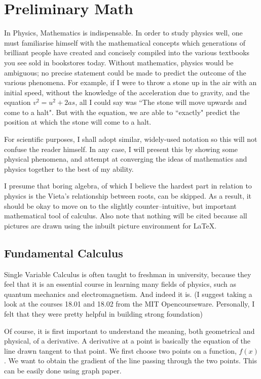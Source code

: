 \section{Preliminary Math}
In Physics, Mathematics is indispensable. In order to study physics well, one must familiarise himself with the mathematical concepts which generations of brilliant people have created and concisely compiled into the various textbooks you see sold in bookstores today. Without mathematics, physics would be ambiguous; no precise statement could be made to predict the outcome of the various phenomena. For example, if I were to throw a stone up in the air with an initial speed, without the knowledge of the acceleration due to gravity, and the equation $v^2=u^2 + 2as$, all I could say was ``The stone will move upwards and come to a halt". But with the equation, we are able to ``exactly" predict the position at which the stone will come to a halt.

For scientific purposes, I shall adopt similar, widely-used notation so this will not confuse the reader himself. In any case, I will present this by showing some physical phenomena, and attempt at converging the ideas of mathematics and physics together to the best of my ability.

I presume that boring algebra, of which I believe the hardest part in relation to physics is the Vieta's relationship between roots, can be skipped. As a result, it should be okay to move on to the slightly counter--intuitive, but important mathematical tool of calculus. Also note that nothing will be cited because all pictures are drawn using the inbuilt picture environment for \LaTeX.

\subsection{Fundamental Calculus}
Single Variable Calculus is often taught to freshman in university, because they feel that it is an essential course in learning many fields of physics, such as quantum mechanics and electromagnetism. And indeed it is. (I suggest taking a look at the courses 18.01 and 18.02 from the MIT Opencourseware. Personally, I felt that they were pretty helpful in building strong foundation)

Of course, it is first important to understand the meaning, both geometrical and physical, of a derivative. A derivative at a point is basically the equation of the line drawn tangent to that point. We first choose two points on a function, $f(x)$. We want to obtain the gradient of the line passing through the two points. This can be easily done using graph paper.


